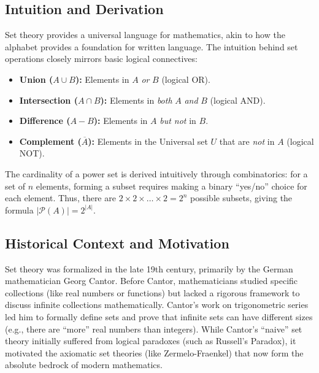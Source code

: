 \documentclass[12pt]{article}
\begin{document}
\subsection{Intuition and Derivation}
Set theory provides a universal language for mathematics, akin to how the alphabet provides a foundation for written language. The intuition behind set operations closely mirrors basic logical connectives:
\begin{itemize}
    \item \textbf{Union ($A \cup B$):} Elements in $A$ \textit{or} $B$ (logical OR).
    \item \textbf{Intersection ($A \cap B$):} Elements in \textit{both} $A$ \textit{and} $B$ (logical AND).
    \item \textbf{Difference ($A - B$):} Elements in $A$ \textit{but not} in $B$.
    \item \textbf{Complement ($\overline{A}$):} Elements in the Universal set $U$ that are \textit{not} in $A$ (logical NOT).
\end{itemize}
The cardinality of a power set is derived intuitively through combinatorics: for a set of $n$ elements, forming a subset requires making a binary ``yes/no'' choice for each element. Thus, there are $2 \times 2 \times \dots \times 2 = 2^n$ possible subsets, giving the formula $|\mathcal{P}(A)| = 2^{|A|}$.

\subsection{Historical Context and Motivation}
Set theory was formalized in the late 19th century, primarily by the German mathematician Georg Cantor. Before Cantor, mathematicians studied specific collections (like real numbers or functions) but lacked a rigorous framework to discuss infinite collections mathematically. Cantor's work on trigonometric series led him to formally define sets and prove that infinite sets can have different sizes (e.g., there are ``more'' real numbers than integers). While Cantor's ``naive'' set theory initially suffered from logical paradoxes (such as Russell's Paradox), it motivated the axiomatic set theories (like Zermelo-Fraenkel) that now form the absolute bedrock of modern mathematics.
\end{document}
